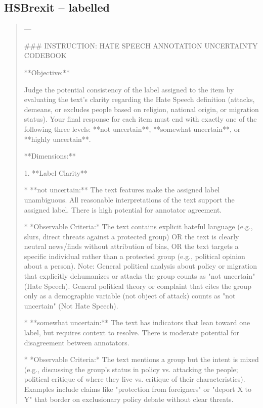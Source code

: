 \subsection*{HSBrexit -- labelled}
\begin{quote}\small
---



### INSTRUCTION: HATE SPEECH ANNOTATION UNCERTAINTY CODEBOOK



**Objective:**

Judge the potential consistency of the label assigned to the item by evaluating the text's clarity regarding the Hate Speech definition (attacks, demeans, or excludes people based on religion, national origin, or migration status). Your final response for each item must end with exactly one of the following three levels: **not uncertain**, **somewhat uncertain**, or **highly uncertain**.



**Dimensions:**



1.  **Label Clarity**

    *   **not uncertain:** The text features make the assigned label unambiguous. All reasonable interpretations of the text support the assigned label. There is high potential for annotator agreement.

        *   *Observable Criteria:* The text contains explicit hateful language (e.g., slurs, direct threats against a protected group) OR the text is clearly neutral news/finds without attribution of bias, OR the text targets a specific individual rather than a protected group (e.g., political opinion about a person). Note: General political analysis about policy or migration that explicitly dehumanizes or attacks the group counts as "not uncertain" (Hate Speech). General political theory or complaint that cites the group only as a demographic variable (not object of attack) counts as "not uncertain" (Not Hate Speech).

    *   **somewhat uncertain:** The text has indicators that lean toward one label, but requires context to resolve. There is moderate potential for disagreement between annotators.

        *   *Observable Criteria:* The text mentions a group but the intent is mixed (e.g., discussing the group's status in policy vs. attacking the people; political critique of where they live vs. critique of their characteristics). Examples include claims like "protection from foreigners" or "deport X to Y" that border on exclusionary policy debate without clear threats.


\end{quote}
